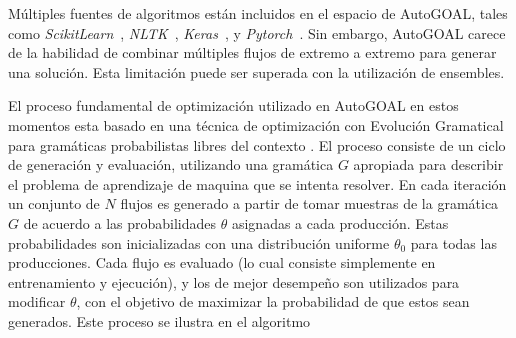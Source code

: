 Múltiples fuentes de algoritmos están incluidos en el espacio de AutoGOAL, tales como \textit{ScikitLearn}~\parencite{pedregosa2011scikit}, \textit{NLTK}~\parencite{nltk}, \textit{Keras}~\parencite{chollet2015keras}, y \textit{Pytorch}~\parencite{paszke2019pytorch}.
Sin embargo, AutoGOAL carece de la habilidad de combinar múltiples flujos de extremo a extremo para generar una solución.
Esta limitación puede ser superada con la utilización de ensembles.

El proceso fundamental de optimización utilizado en AutoGOAL en estos momentos esta basado en una técnica de optimización con Evolución Gramatical para gramáticas probabilistas libres del contexto \parencite{megane2021probabilistic}.
El proceso consiste de un ciclo de generación y evaluación, utilizando una gramática $G$ apropiada para describir el problema de aprendizaje de maquina que se intenta resolver.
En cada iteración un conjunto de $N$ flujos es generado a partir de tomar muestras de la gramática $G$ de acuerdo a las probabilidades $\theta$ asignadas a cada producción.
Estas probabilidades son inicializadas con una distribución uniforme $\theta_0$ para todas las producciones.
Cada flujo es evaluado (lo cual consiste simplemente en entrenamiento y ejecución), y los de mejor desempeño son utilizados para modificar $\theta$, con el objetivo de maximizar la probabilidad de que estos sean generados. Este proceso se ilustra en el algoritmo 

